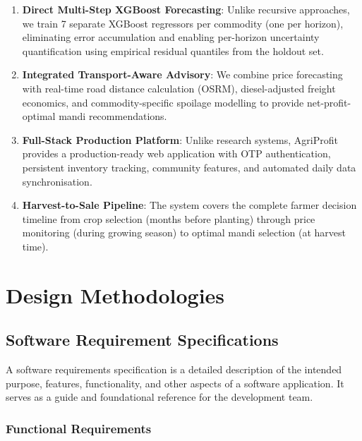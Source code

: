 \documentclass[12pt,a4paper]{report}
\begin{document}
\begin{enumerate}
    \item \textbf{Direct Multi-Step XGBoost Forecasting}: Unlike recursive approaches,
    we train 7 separate XGBoost regressors per commodity (one per horizon), eliminating
    error accumulation and enabling per-horizon uncertainty quantification using empirical
    residual quantiles from the holdout set.
    \item \textbf{Integrated Transport-Aware Advisory}: We combine price forecasting with
    real-time road distance calculation (OSRM), diesel-adjusted freight economics, and
    commodity-specific spoilage modelling to provide net-profit-optimal mandi recommendations.
    \item \textbf{Full-Stack Production Platform}: Unlike research systems, AgriProfit
    provides a production-ready web application with OTP authentication, persistent
    inventory tracking, community features, and automated daily data synchronisation.
    \item \textbf{Harvest-to-Sale Pipeline}: The system covers the complete farmer decision
    timeline from crop selection (months before planting) through price monitoring (during
    growing season) to optimal mandi selection (at harvest time).
\end{enumerate}

\chapter{Design Methodologies}

\section{Software Requirement Specifications}

A software requirements specification is a detailed description of the intended purpose,
features, functionality, and other aspects of a software application. It serves as a guide
and foundational reference for the development team.

\subsection{Functional Requirements}
\end{document}
